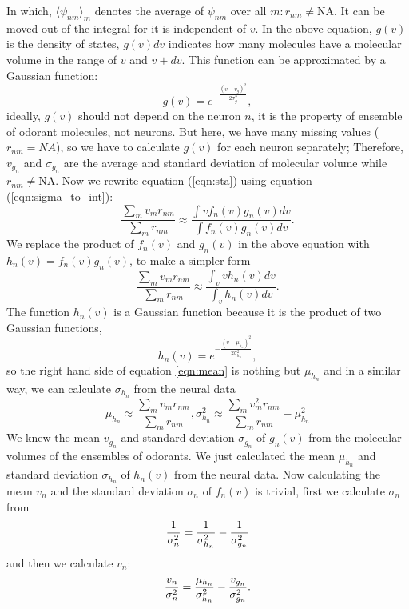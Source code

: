 \documentclass[a1paper,fontscale=0.5]{baposter} %
\begin{document}
\begin{poster}
{In which, 
$\langle \psi_{nm} \rangle_m$ denotes the average of $\psi_{nm}$ over all $m: r_{nm} \neq \text{NA}$. 
It can be moved out of the integral for it is independent of $v$.
In the above equation, 
$g(v)$ is the density of states, $g(v) dv$ indicates how many molecules have a molecular volume in the range of $v$ and $v+dv$.
This function can be approximated by a Gaussian function:  
\begin{equation}
	g(v) = e^{-\frac{(v- v_{g})^2}{2 \sigma_{g}^2}},
	\label{eqn:hist-volumes}
\end{equation}
ideally, $g(v)$ should not depend on the neuron $n$, 
it is the property of ensemble of odorant molecules, not neurons. 
But here, we have many missing values ($r_{nm} = NA$), 
so we have to calculate $g(v)$ for each neuron separately; 
Therefore, $v_{g_n}$ and $\sigma_{g_n}$ are the average and standard deviation of molecular volume while $r_{nm} \neq \text{NA}$.
Now we rewrite equation (\ref{eqn:sta}) using equation (\ref{eqn:sigma_to_int}):
\begin{equation}
	\frac{\displaystyle \sum_{m} v_m r_{nm}}{\displaystyle \sum_{m} r_{nm}} \approx \frac{\displaystyle \int v f_n(v) g_n(v) dv}{\displaystyle \int f_n(v) g_n(v) dv}.
	\label{eqn:sta_int}
\end{equation}
We replace the product of $f_n(v)$ and $g_n(v)$ in the above equation with $h_n(v) = f_n(v) g_n(v)$, to make a simpler form
\begin{equation}
	\frac{\displaystyle \sum_{m} v_m r_{nm}}{\displaystyle \sum_{m} r_{nm}} \approx \frac{\displaystyle \int_v v h_n(v) dv}{ \displaystyle \int_v  h_n(v) dv }.
	\label{eqn:mean}
\end{equation}
The function $h_n(v)$ is a Gaussian function because it is the product of two Gaussian functions, 
\begin{equation}
h_n(v) = e^{-\frac{(v-\mu_{h_n})^2}{2\sigma_{h_n}^2}}, 
\end{equation}
so the right hand side of equation \ref{eqn:mean} is nothing but $\mu_{h_n}$ and 
in a similar way, we can calculate $\sigma_{h_n}$ from the neural data
\begin{equation}
	\mu_{h_n} \approx \frac{\displaystyle \sum_{m} v_m r_{nm}}{\displaystyle \sum_{m} r_{nm}}, 
	\sigma_{h_n}^2 \approx \frac{\displaystyle \sum_{m} v_m^2 r_{nm}}{\displaystyle \sum_{m} r_{nm}} - \mu_{h_n}^2
	\label{eqn:final_h}
\end{equation}
We knew the mean $v_{g_n}$ and standard deviation $\sigma_{g_n}$ of $g_n(v)$ from the molecular volumes of the ensembles of odorants. 
We just calculated the mean $\mu_{h_n}$ and standard deviation $\sigma_{h_n}$ of $h_n(v)$ from the neural data.
Now calculating the mean $v_n$ and the standard deviation $\sigma_n$ of $f_n(v)$ is trivial,
first we calculate $\sigma_n$ from 
\begin{equation}
\large
	\frac{1}{\sigma_n^2} = \frac{1}{\sigma^2_{h_n}}  - \frac{1}{\sigma^2_{g_n}}
\end{equation}
and then we calculate $v_n$: 
\begin{equation}
\large
	\frac{v_n}{\sigma_n^2}  =    \frac{\mu_{h_n}}{\sigma^2_{h_n}} - \frac{v_{g_n}}{\sigma^2_{g_n}}.
\end{equation}

}
\end{poster}
\end{document}
